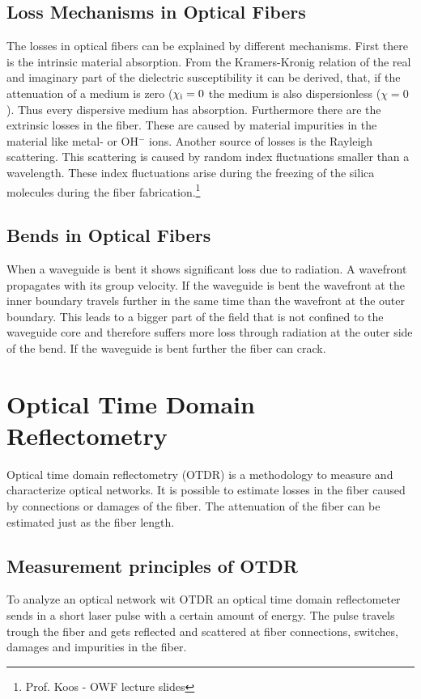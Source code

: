 \subsection{Loss Mechanisms in Optical Fibers}
\label{loss}
The losses in optical fibers can be explained by different mechanisms. First there is the intrinsic material absorption. From the Kramers-Kronig relation of the real and imaginary part of the dielectric susceptibility it can be derived, that, if the attenuation of a medium is zero ($\chi_{\mathrm{i}}=0$ the medium is also dispersionless ($\chi=0$). Thus every dispersive medium has absorption. Furthermore there are the extrinsic losses in the fiber. These are caused by material impurities in the material like metal- or OH$^-$ ions. Another source of losses is the Rayleigh scattering. This scattering is caused by random index fluctuations smaller than a wavelength. These index fluctuations arise during the freezing of the silica molecules during the fiber fabrication.\footnote[1]{Prof. Koos - OWF lecture slides}

\subsection{Bends in Optical Fibers}

When a waveguide is bent it shows significant loss due to radiation. A wavefront propagates with its group velocity. If the waveguide is bent the wavefront at the inner boundary travels further in the same time than the wavefront at the outer boundary. This leads to a bigger part of the field that is not confined to the waveguide core and therefore suffers more loss through radiation at the outer side of the bend. If the waveguide is bent further the fiber can crack.\footnotemark[1]%


\section{Optical Time Domain Reflectometry}
Optical time domain reflectometry (OTDR) is a methodology to measure and characterize optical networks. It is possible to estimate losses in the fiber caused by connections or damages of the fiber. The attenuation of the fiber can be estimated just as the fiber length.

\subsection{Measurement principles of OTDR}
\label{subsec:Principle}
To analyze an optical network wit OTDR an optical time domain reflectometer sends in a short laser pulse with a certain amount of energy. The pulse travels trough the fiber and gets reflected and scattered at fiber connections, switches, damages and impurities in the fiber. 

